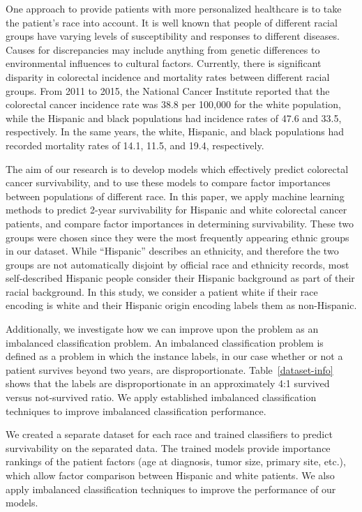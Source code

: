 \documentclass[review]{elsarticle}
\begin{document}
One approach to provide patients with more personalized healthcare is to take the patient's race into account. It is well known that people of different racial groups have varying levels of susceptibility and responses to different diseases. Causes for discrepancies may include anything from genetic differences to environmental influences to cultural factors. Currently, there is significant disparity in colorectal incidence and mortality rates between different racial groups. From 2011 to 2015, the National Cancer Institute reported that the colorectal cancer incidence rate was 38.8 per 100,000 for the white population, while the Hispanic and black populations had incidence rates of 47.6 and 33.5, respectively. In the same years, the white, Hispanic, and black populations had recorded mortality rates of 14.1, 11.5, and 19.4, respectively\cite{race-mortality}.

The aim of our research is to develop models which effectively predict colorectal cancer survivability, and to use these models to compare factor importances between populations of different race. In this paper, we apply machine learning methods to predict 2-year survivability for Hispanic and white colorectal cancer patients, and compare factor importances in determining survivability. These two groups were chosen since they were the most frequently appearing ethnic groups in our dataset. While “Hispanic” describes an ethnicity, and therefore the two groups are not automatically disjoint by official race and ethnicity records, most self-described Hispanic people consider their Hispanic background as part of their racial background\cite{hispanic_origin}. In this study, we consider a patient white if their race encoding is white and their Hispanic origin encoding labels them as non-Hispanic.

Additionally, we investigate how we can improve upon the problem as an imbalanced classification problem. An imbalanced classification problem is defined as a problem in which the instance labels, in our case whether or not a patient survives beyond two years, are disproportionate. Table~\ref{dataset-info} shows that the labels are disproportionate in an approximately 4:1 survived versus not-survived ratio. We apply established imbalanced classification techniques to improve imbalanced classification performance.

We created a separate dataset for each race and trained classifiers to predict survivability on the separated data. The trained models provide importance rankings of the patient factors (age at diagnosis, tumor size, primary site, etc.), which allow factor comparison between Hispanic and white patients. We also apply imbalanced classification techniques to improve the performance of our models. 
\end{document}
